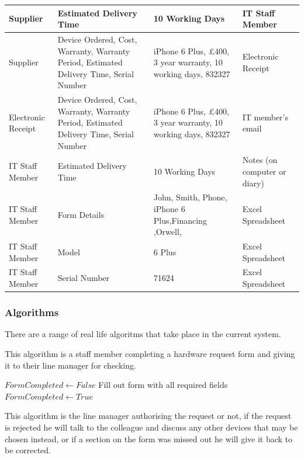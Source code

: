 \begin{center}
\begin{tabular}{|p{3cm}|p{3cm}|p{4cm}|p{3cm}|}
Supplier & Estimated Delivery Time & 10 Working Days & IT Staff Member \\ \hline
Supplier & Device Ordered, Cost, Warranty, Warranty Period, Estimated Delivery Time, Serial Number & iPhone 6 Plus, £400, 3 year warranty, 10 working days, 832327 & Electronic Receipt \\ \hline
Electronic Receipt  & Device Ordered, Cost, Warranty, Warranty Period, Estimated Delivery Time, Serial Number & iPhone 6 Plus, £400, 3 year warranty, 10 working days, 832327 & IT member's email \\ \hline
IT Staff Member & Estimated Delivery Time & 10 Working Days & Notes (on computer or diary) \\ \hline
IT Staff Member                      & Form Details   & John, Smith, Phone, iPhone 6 Plus,Financing ,Orwell, & Excel Spreadsheet                                   \\ \hline
IT Staff Member                             & Model                              & 6 Plus                                             & Excel Spreadsheet                                       \\ \hline
IT Staff Member                       & Serial Number                      & 71624                                          &  Excel Spreadsheet           \\ \hline
\end{tabular}
\end{center}

\newpage
\subsubsection{Algorithms}

There are a range of real life algoritms that take place in the current system.

This algorithm is a staff member completing a hardware request form and giving it to their line manager for checking.

\begin{algorithm}[H]
\begin{algorithmic}
\State $FormCompleted  \leftarrow False$
	\State Fill out form with all required fields
	\State $FormCompleted \leftarrow True$
\Else
\EndIf
\end{algorithmic}
\end{algorithm}

This algorithm is the line manager authorising the request or not, if the request is rejected he will talk to the colleague and discuss any other devices that may be chosen instead, or if a section on the form was missed out he will give it back to be corrected.

